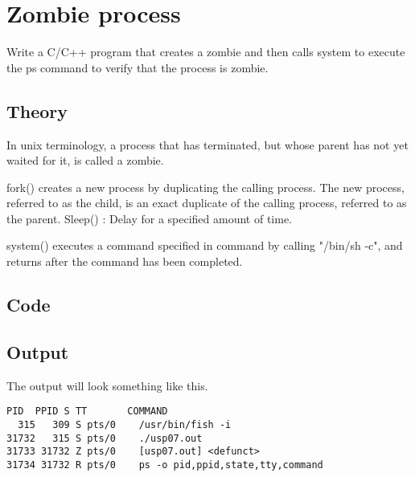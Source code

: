 \chapter{Zombie process}

Write a C/C++ program that creates a zombie and then calls system to execute the ps command to verify that the process is zombie.

\section{Theory}

In unix terminology, a process that has terminated, but whose parent has not yet waited for it, is called a zombie.

fork() creates a new process by duplicating the calling process. The new process, referred to as the child, is an exact duplicate of the calling process, referred to as the parent. Sleep() : Delay for a specified amount of time.

system() executes a command specified in command by calling "/bin/sh -c", and returns after the command has been completed.

\section{Code}



\section{Output}

The output will look something like this.

\begin{lstlisting}[style=shell-output]
  PID  PPID S TT       COMMAND
  315   309 S pts/0    /usr/bin/fish -i
31732   315 S pts/0    ./usp07.out
31733 31732 Z pts/0    [usp07.out] <defunct>
31734 31732 R pts/0    ps -o pid,ppid,state,tty,command
\end{lstlisting}
